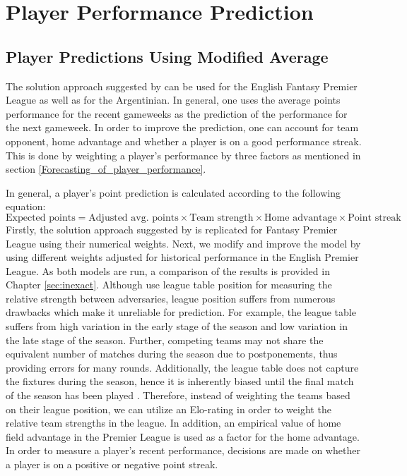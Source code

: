 \newpage



\section{Player Performance Prediction} \label{Player_Performance}



\subsection{Player Predictions Using Modified Average} \label{Sol_approach_Modified_Average}

The solution approach suggested by \cite{Bonomo} can be used for the English Fantasy Premier League as well as for the Argentinian. In general, one uses the average points performance for the recent gameweeks as the prediction of the performance for the next gameweek. In order to improve the prediction, one can account for team opponent, home advantage and whether a player is on a good performance streak. This is done by weighting a player's performance by three factors as mentioned in section \ref{Forecasting_of_player_performance}.

\newpar

In general, a player's point prediction is calculated according to the following equation:
\begin{equation}
    \textrm{Expected points} = \textrm{Adjusted avg. points} \times \textrm{Team strength} \times \textrm{Home advantage} \times \textrm{Point streak}
\end{equation}
\newpar
Firstly, the solution approach suggested by \cite{Bonomo} is replicated for Fantasy Premier League using their numerical weights. Next, we modify and improve the model by using different weights adjusted for historical performance in the English Premier League. As both models are run, a comparison of the results is provided in Chapter \ref{sec:inexact}. 
\newpar
Although \cite{Bonomo} use league table position for measuring the relative strength between adversaries, league position suffers from numerous drawbacks which make it unreliable for prediction. For example, the league table suffers from high variation in the early stage of the season and low variation in the late stage of the season. Further, competing teams may not share the equivalent number of matches during the season due to postponements, thus providing errors for many rounds. Additionally, the league table does not capture the fixtures during the season, hence it is inherently biased until the final match of the season has been played \citep{Constantinou}. Therefore, instead of weighting the teams based on their league position, we can utilize an Elo-rating in order to weight the relative team strengths in the league. In addition, an empirical value of home field advantage in the Premier League is used as a factor for the home advantage. In order to measure a player's recent performance, decisions are made on whether a player is on a positive or negative point streak.


